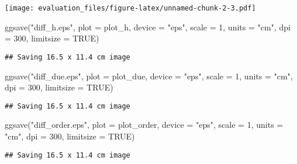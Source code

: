 \documentclass[
]{article}
\newenvironment{Shaded}{\begin{snugshade}}{\end{snugshade}}
\newcommand{\AttributeTok}[1]{\textcolor[rgb]{0.77,0.63,0.00}{#1}}
\newcommand{\ConstantTok}[1]{\textcolor[rgb]{0.00,0.00,0.00}{#1}}
\newcommand{\DecValTok}[1]{\textcolor[rgb]{0.00,0.00,0.81}{#1}}
\newcommand{\FunctionTok}[1]{\textcolor[rgb]{0.00,0.00,0.00}{#1}}
\newcommand{\NormalTok}[1]{#1}
\newcommand{\StringTok}[1]{\textcolor[rgb]{0.31,0.60,0.02}{#1}}
\begin{document}
\texttt{[image: evaluation\_files/figure-latex/unnamed-chunk-2-3.pdf]}

\begin{Shaded}
\begin{Highlighting}[]
\FunctionTok{ggsave}\NormalTok{(}\StringTok{"diff\_h.eps"}\NormalTok{,}
       \AttributeTok{plot =}\NormalTok{ plot\_h,}
       \AttributeTok{device =} \StringTok{"eps"}\NormalTok{,}
       \AttributeTok{scale =} \DecValTok{1}\NormalTok{, }\AttributeTok{units =} \StringTok{"cm"}\NormalTok{,}
       \AttributeTok{dpi =} \DecValTok{300}\NormalTok{,}
       \AttributeTok{limitsize =} \ConstantTok{TRUE}\NormalTok{)}
\end{Highlighting}
\end{Shaded}

\begin{verbatim}
## Saving 16.5 x 11.4 cm image
\end{verbatim}

\begin{Shaded}
\begin{Highlighting}[]
\FunctionTok{ggsave}\NormalTok{(}\StringTok{"diff\_due.eps"}\NormalTok{,}
       \AttributeTok{plot =}\NormalTok{ plot\_due,}
       \AttributeTok{device =} \StringTok{"eps"}\NormalTok{,}
       \AttributeTok{scale =} \DecValTok{1}\NormalTok{, }\AttributeTok{units =} \StringTok{"cm"}\NormalTok{,}
       \AttributeTok{dpi =} \DecValTok{300}\NormalTok{,}
       \AttributeTok{limitsize =} \ConstantTok{TRUE}\NormalTok{)}
\end{Highlighting}
\end{Shaded}

\begin{verbatim}
## Saving 16.5 x 11.4 cm image
\end{verbatim}

\begin{Shaded}
\begin{Highlighting}[]
\FunctionTok{ggsave}\NormalTok{(}\StringTok{"diff\_order.eps"}\NormalTok{,}
       \AttributeTok{plot =}\NormalTok{ plot\_order,}
       \AttributeTok{device =} \StringTok{"eps"}\NormalTok{,}
       \AttributeTok{scale =} \DecValTok{1}\NormalTok{, }\AttributeTok{units =} \StringTok{"cm"}\NormalTok{,}
       \AttributeTok{dpi =} \DecValTok{300}\NormalTok{,}
       \AttributeTok{limitsize =} \ConstantTok{TRUE}\NormalTok{)}
\end{Highlighting}
\end{Shaded}

\begin{verbatim}
## Saving 16.5 x 11.4 cm image
\end{verbatim}
\end{document}
